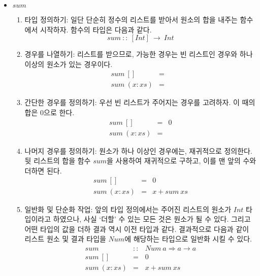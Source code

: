 \begin{itemize}
\item $sum$
  \begin{enumerate}
  \item 타입 정의하기: 일단 단순히 정수의 리스트를 받아서 원소의 합을 내주는
    함수에서 시작하자. 함수의 타입은 다음과 같다.
    \[sum~::~[Int]~\rightarrow~Int\]
  \item 경우를 나열하기: 리스트를 받으므로, 가능한 경우는 빈 리스트인 경우와
    하나 이상의 원소가 있는 경우이다.
    \[\begin{array}{lcl}
      sum~[]       & = & \\
      sum~(x : xs) & = &
    \end{array}\]
  \item 간단한 경우를 정의하기: 우선 빈 리스트가 주어지는 경우를 고려하자. 이
    때의 합은 $0$으로 한다.
    \[\begin{array}{lcl}
      sum~[]       & = & 0 \\
      sum~(x : xs) & = &
    \end{array}\]
  \item 나머지 경우를 정의하기: 원소가 하나 이상인 경우에는, 재귀적으로
   정의한다. 뒷 리스트의 합을 함수 $sum$을 사용하여 재귀적으로 구하고, 이를 맨
   앞의 수와 더하면 된다.
    \[\begin{array}{lcl}
      sum~[]       & = & 0 \\
      sum~(x : xs) & = & x + sum~xs
    \end{array}\]
  \item 일반화 및 단순화 작업: 앞의 타입 정의에서는 주어진 리스트의 원소가
    $Int$ 타입이라고 하였으나, 사실 `더할' 수 있는 모든 것은 원소가 될 수
    있다. 그리고 어떤 타입의 값을 더하 결과 역시 이전 타입과 같다. 결과적으로
    다음과 같이 리스트 원소 및 결과 타입을 $Num$에 해당하는 타입으로 일반화
    시킬 수 있다.
    \[\begin{array}{lcl}
      sum          & :: & Num~a \Rightarrow a \rightarrow a \\
      sum~[]       &  = & 0 \\
      sum~(x : xs) &  = & x + sum~xs
    \end{array}\]
  \end{enumerate}


\end{itemize}

